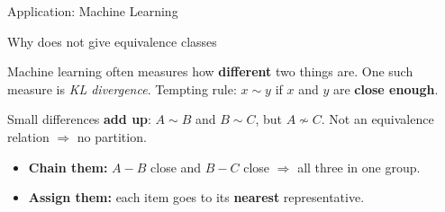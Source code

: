 \documentclass[10pt]{beamer}
\begin{document}
\begin{frame}{Application: Machine Learning}
\footnotesize

Why  does not give equivalence classes

\begin{mygreenbox}[title=A tempting rule]
Machine learning often measures how \textbf{different} two things are. One such measure is
\textit{KL divergence}.  Tempting rule: $x \sim y$ if $x$ and $y$ are \textbf{close enough}.
\end{mygreenbox}

\pause
\begin{center}
\end{center}

\pause
\begin{myredbox}[title=Transitivity fails]
Small differences \textbf{add up}: $A \sim B$ and $B \sim C$, but $A \not\sim C$.
Not an equivalence relation $\Rightarrow$ \alert{no partition}.
\end{myredbox}

\pause
\begin{mybluebox}[title=What we do instead]
\begin{itemize}\itemsep0pt
	\item \textbf{Chain them:} $A\!-\!B$ close and $B\!-\!C$ close $\Rightarrow$ all three in one group.
	\item \textbf{Assign them:} each item goes to its \textbf{nearest} representative.
\end{itemize}
\end{mybluebox}

\end{frame}


\end{document}
